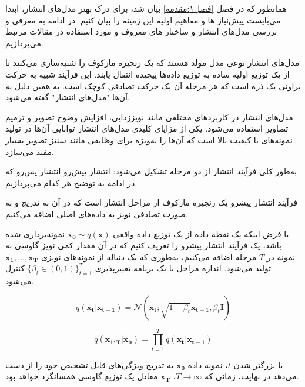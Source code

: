 
\label{فصل۲:مفاهیم اولیه}
همانطور که در فصل \ref{فصل۱:مقدمه} بیان شد، برای درک بهتر مدل‌های انتشار، ابتدا می‌بایست پیش‌نیاز ها و مفاهیم اولیه این زمینه را بیان کنیم. در ادامه به معرفی و بررسی مدل‌های انتشار و ساختار های معروف و مورد استفاده در مقالات مرتبط می‌پردازیم.






مدل‌های انتشار نوعی مدل مولد هستند که یک زنجیره مارکوف را شبیه‌سازی می‌کنند تا از یک توزیع اولیه ساده به توزیع داده‌ها پیچیده انتقال یابند. این فرآیند شبیه به حرکت براونی یک ذره است که هر مرحله آن یک حرکت تصادفی کوچک است. به همین دلیل به آن‌ها "مدل‌های انتشار" گفته می‌شود.

مدل‌های انتشار در کاربردهای مختلفی مانند نویززدایی، افزایش وضوح تصویر و ترمیم تصاویر استفاده می‌شود. یکی از مزایای کلیدی مدل‌های انتشار توانایی آن‌ها در تولید نمونه‌های با کیفیت بالا است که آن‌ها را به‌ویژه برای وظایفی مانند سنتز تصویر بسیار مفید می‌سازد.

به‌طور کلی فرآیند انتشار از دو مرحله تشکیل می‌شود:
 انتشار پیش‌رو
 انتشار پس‌رو
که در ادامه به توضیح هر کدام می‌پردازیم.


فرآیند انتشار پیشرو یک زنجیره مارکوف از مراحل انتشار است که در آن به تدریج و به صورت تصادفی نویز به داده‌های اصلی اضافه می‌کنیم.

با فرض اینکه یک نقطه داده از یک توزیع داده واقعی $ \mathbf{x_0} \sim q(\mathbf{x}) $ نمونه‌برداری شده باشد، یک فرآیند انتشار پیشرو را تعریف کنیم که در آن مقدار کمی نویز گاوسی به نمونه در $ T $ مرحله اضافه می‌کنیم، به‌طوری که یک دنباله از نمونه‌های نویزی $ \mathbf{x_1}, \ldots, \mathbf{x_T} $ تولید می‌شود. اندازه مراحل با یک برنامه تغییرپذیری $\{\beta_t \in (0, 1)\}_{t=1}^{T}$ کنترل می‌شود.

\begin{equation}
	q(\mathbf{x_t}|\mathbf{x_{t-1}}) = \mathcal{N}(\mathbf{x_t}; \sqrt{1 - \beta_t} \mathbf{x_{t-1}}, \beta_t \mathbf{I})
\end{equation}

\begin{equation}
	q(\mathbf{x_{1:T}}|\mathbf{x_0}) = \prod_{t=1}^{T} q(\mathbf{x_t}|\mathbf{x_{t-1}})
\end{equation}

با بزرگتر شدن $ t $، نمونه داده $ \mathbf{x_0} $ به تدریج ویژگی‌های قابل تشخیص خود را از دست می‌دهد  در نهایت، زمانی که $ T \to \infty $، $\mathbf{x_T}$ معادل یک توزیع گاوسی همسانگرد خواهد بود.






